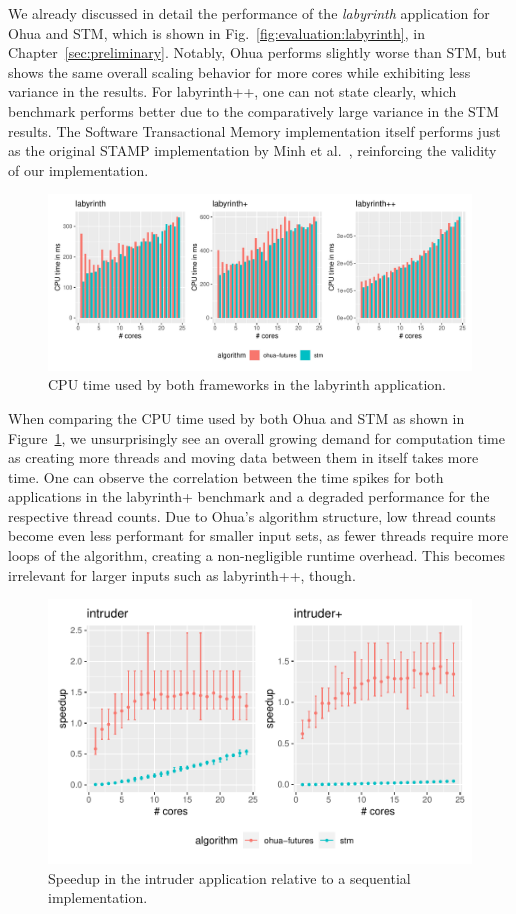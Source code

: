 We already discussed in detail the performance of the \emph{labyrinth} application for Ohua and STM, which is shown in Fig.~\ref{fig:evaluation:labyrinth}, in Chapter~\ref{sec:preliminary}.
Notably, Ohua performs slightly worse than STM, but shows the same overall scaling behavior for more cores while exhibiting less variance in the results.
For labyrinth++, one can not state clearly, which benchmark performs better due to the comparatively large variance in the STM results.
The Software Transactional Memory implementation itself performs just as the original STAMP implementation by Minh et al.~\cite{minh2008stamp}, reinforcing the validity of our implementation.

\begin{figure}
    \centering
    \includegraphics[width=\textwidth,keepaspectratio]{gfx/results/cpu_labyrinth_comb}
    \caption{CPU time used by both frameworks in the labyrinth application.}%
    \label{fig:evaluation:labyrinth-cpu}
\end{figure}

When comparing the CPU time used by both Ohua and STM as shown in Figure~\ref{fig:evaluation:labyrinth-cpu}, we unsurprisingly see an overall growing demand for computation time as creating more threads and moving data between them in itself takes more time.
One can observe the correlation between the time spikes for both applications in the labyrinth+ benchmark and a degraded performance for the respective thread counts.
Due to Ohua's algorithm structure, low thread counts become even less performant for smaller input sets, as fewer threads require more loops of the algorithm, creating a non-negligible runtime overhead.
This becomes irrelevant for larger inputs such as labyrinth++, though.


\begin{figure}
    \centering
    \includegraphics[width=.66\textwidth,keepaspectratio]{gfx/results/intruder_comb}
    \caption{Speedup in the intruder application relative to a sequential implementation.}%
    \label{fig:evaluation:intruder}
\end{figure}

